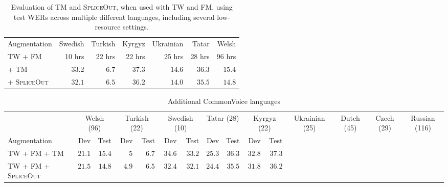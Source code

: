 \documentclass{article}
\newcommand{\SpA}{{\textsc{SpliceOut}}\xspace}
\begin{document}
\begin{table}[h!]
    \centering
    \caption{Evaluation of TM and \SpA, when used with TW and FM, using test WERs across multiple different languages, including several low-resource settings.}
    \begin{tabular}{l|rrrrr|r}
    \toprule
     Augmentation & Swedish  & Turkish  &  Kyrgyz & Ukrainian & Tatar & Welsh\\
    TW + FM & 10 hrs & 22 hrs & 22 hrs & 25 hrs & 28 hrs & 96 hrs\\ 
    \midrule
     + TM~\citep{specaugment,espnet} & $33.2$ &  $6.7$  & $37.3$ & $14.6$ & $36.3$ & $15.4$\\
     + \SpA & $\mathbf{32.1}$ & $\mathbf{6.5}$ & $\mathbf{36.2}$ & $\mathbf{14.0}$ & $\mathbf{35.5}$ & 
      $\mathbf{14.8}$\\
    \bottomrule
    \end{tabular}
    \label{tab:commonvoice}
\end{table}
\iffalse
\begin{table}[]
    \centering
    \caption{Additional CommonVoice languages}
    \begin{tabular}{lrrrrrrrrrr}
    \toprule
     & \multicolumn{2}{c}{Welsh (96)} & \multicolumn{2}{c}{Turkish (22)} & \multicolumn{2}{c}{Swedish (10)} & \multicolumn{2}{c}{Tatar (28)} & \multicolumn{2}{c}{Kyrgyz (22)} & \multicolumn{2}{c}{Ukrainian (25)}& \multicolumn{2}{c}{Dutch (45)}& \multicolumn{2}{c}{Czech (29)}& \multicolumn{2}{c}{Russian (116)}\\
     Augmentation & Dev & Test & Dev & Test & Dev & Test & Dev & Test & Dev & Test\\
    \midrule
    TW + FM + TM &  $\mathbf{21.1}$ & $15.4$ & $5$ & $6.7$ & $34.6$ & $33.2$ & $25.3$ & $36.3$ & $32.8$ & $37.3$\\
    TW + FM + \SpA & $21.5$& $\mathbf{14.8}$ & $\mathbf{4.9}$ & $\mathbf{6.5}$ &$\mathbf{32.4}$ & $\mathbf{32.1}$ & $\mathbf{24.4}$ & $\mathbf{35.5}$ & $\mathbf{31.8}$ & $\mathbf{36.2}$\\ 
    \bottomrule
    \end{tabular}
    \label{tab:my_label}
\end{table}
\end{document}
